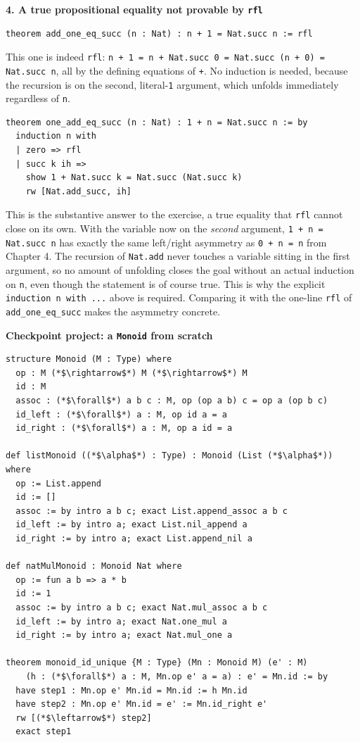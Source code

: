 \textbf{4. A true propositional equality not provable by \texttt{rfl}}

\begin{lstlisting}
theorem add_one_eq_succ (n : Nat) : n + 1 = Nat.succ n := rfl
\end{lstlisting}

This one is indeed \texttt{rfl}: \texttt{n + 1 = n + Nat.succ 0 = Nat.succ (n + 0) = Nat.succ n}, all by the defining equations of \texttt{+}. No induction is needed, because the recursion is on the second, literal-\texttt{1} argument, which unfolds immediately regardless of \texttt{n}.

\begin{lstlisting}
theorem one_add_eq_succ (n : Nat) : 1 + n = Nat.succ n := by
  induction n with
  | zero => rfl
  | succ k ih =>
    show 1 + Nat.succ k = Nat.succ (Nat.succ k)
    rw [Nat.add_succ, ih]
\end{lstlisting}

This is the substantive answer to the exercise, a true equality that \texttt{rfl} cannot close on its own. With the variable now on the \emph{second} argument, \texttt{1 + n = Nat.succ n} has exactly the same left/right asymmetry as \texttt{0 + n = n} from Chapter 4. The recursion of \texttt{Nat.add} never touches a variable sitting in the first argument, so no amount of unfolding closes the goal without an actual induction on \texttt{n}, even though the statement is of course true. This is why the explicit \texttt{induction n with ...} above is required. Comparing it with the one-line \texttt{rfl} of \texttt{add\_\allowbreak{}one\_\allowbreak{}eq\_\allowbreak{}succ} makes the asymmetry concrete.

\textbf{Checkpoint project: a \texttt{Monoid} from scratch}

\begin{lstlisting}
structure Monoid (M : Type) where
  op : M (*$\rightarrow$*) M (*$\rightarrow$*) M
  id : M
  assoc : (*$\forall$*) a b c : M, op (op a b) c = op a (op b c)
  id_left : (*$\forall$*) a : M, op id a = a
  id_right : (*$\forall$*) a : M, op a id = a

def listMonoid ((*$\alpha$*) : Type) : Monoid (List (*$\alpha$*)) where
  op := List.append
  id := []
  assoc := by intro a b c; exact List.append_assoc a b c
  id_left := by intro a; exact List.nil_append a
  id_right := by intro a; exact List.append_nil a

def natMulMonoid : Monoid Nat where
  op := fun a b => a * b
  id := 1
  assoc := by intro a b c; exact Nat.mul_assoc a b c
  id_left := by intro a; exact Nat.one_mul a
  id_right := by intro a; exact Nat.mul_one a

theorem monoid_id_unique {M : Type} (Mn : Monoid M) (e' : M)
    (h : (*$\forall$*) a : M, Mn.op e' a = a) : e' = Mn.id := by
  have step1 : Mn.op e' Mn.id = Mn.id := h Mn.id
  have step2 : Mn.op e' Mn.id = e' := Mn.id_right e'
  rw [(*$\leftarrow$*) step2]
  exact step1
\end{lstlisting}

